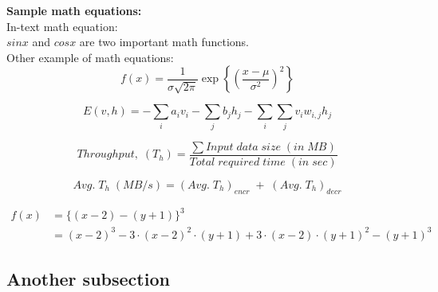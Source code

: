 \noindent \textbf{Sample math equations:} \\

\noindent In-text math equation: \\
$sin x$ and $cos x$ are two important math functions. \\

\noindent Other example of math equations: \\

\begin{equation} 
f(x) = \frac{1}{\sigma \sqrt{2\pi}}\exp \left\{ \left( \frac{x-\mu}{\sigma^2} \right)^2 \right\}
\end{equation}


\begin{equation}
E(v,h)=-\sum_ia_iv_i-\sum_jb_jh_j-\sum_i\sum_jv_iw_{i,j}h_j
\end{equation}

\begin{equation}
Throughput,\;(T_h) = \frac{\sum Input\;data\;size\;(in\;MB)}{Total\;required\;time\;(in\;sec)}
\end{equation}

\begin{equation}
Avg.\;T_h\;(MB/s) = (Avg.\;T_h)_{encr}\;+\;(Avg.\;T_h)_{decr}
\end{equation}

\begin{align*} 
f(x) & = \{(x-2)-(y+1)\}^3 \\
& = (x-2)^3 - 3\cdot(x-2)^2\cdot(y+1) + 3\cdot(x-2)\cdot(y+1)^2 - (y+1)^3
\end{align*}

\subsection{Another subsection}

